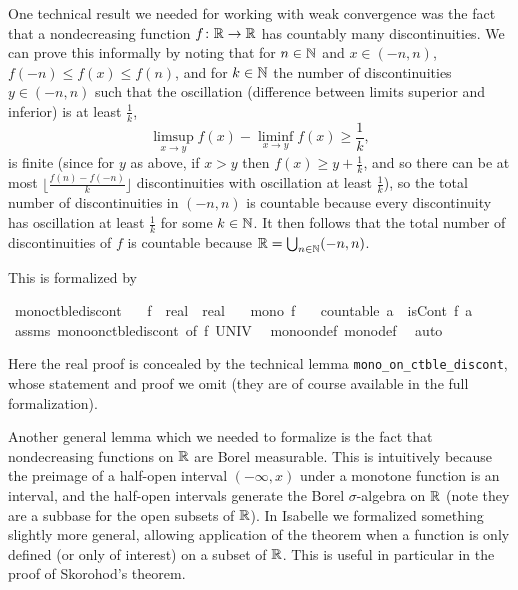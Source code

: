 \documentclass[leqno]{article}
\theoremstyle{definition}
\begin{document}
One technical result we needed for working with weak convergence was the fact that a nondecreasing function $f\colon \mathbb{R} \rightarrow \mathbb{R}$ has countably many discontinuities. We can prove this informally by noting that for $n \in \mathbb{N}$ and $x \in (-n,n)$, $f(-n) \le f(x) \le f(n)$, and for $k \in \mathbb{N}$ the number of discontinuities $y \in (-n,n)$ such that the oscillation (difference between limits superior and inferior) is at least $\frac{1}{k}$, 
\[ \limsup_{x \rightarrow y} f(x) - \liminf_{x \rightarrow y} f(x) \ge \frac{1}{k}, \]
is finite (since for $y$ as above, if $x > y$ then $f(x) \ge y + \frac{1}{k}$, and so there can be at most $\lfloor \frac{f(n) - f(-n)}{k} \rfloor$ discontinuities with oscillation at least $\frac{1}{k}$), so the total number of discontinuities in $(-n,n)$ is countable because every discontinuity has oscillation at least $\frac{1}{k}$ for some $k \in \mathbb{N}$. It then follows that the total number of discontinuities of $f$ is countable because $\mathbb{R} = \bigcup_{n \in \mathbb{N}} (-n,n)$.

This is formalized by

\medskip

\begin{isabellebody}
\isamarkupfalse%
\ mono{\isacharunderscore}ctble{\isacharunderscore}discont{\isacharcolon}\isanewline
\ \ \ f\ {\isacharcolon}{\isacharcolon}\ {\isachardoublequoteopen}real\ {\isasymRightarrow}\ real{\isachardoublequoteclose}\isanewline
\ \ \ {\isachardoublequoteopen}mono\ f{\isachardoublequoteclose}\isanewline
\ \ \ {\isachardoublequoteopen}countable\ {\isacharbraceleft}a{\isachardot}\ {\isasymnot}\ isCont\ f\ a{\isacharbraceright}{\isachardoublequoteclose}\isanewline
{}\isamarkupfalse%
\ assms\ mono{\isacharunderscore}on{\isacharunderscore}ctble{\isacharunderscore}discont\ {\isacharbrackleft}of\ f\ UNIV{\isacharbrackright}\ \isamarkupfalse%
\ mono{\isacharunderscore}on{\isacharunderscore}def\ mono{\isacharunderscore}def\ \isamarkupfalse%
\ auto%
\end{isabellebody}

\medskip

Here the real proof is concealed by the technical lemma \texttt{mono\_on\_ctble\_discont}, whose statement and proof we omit (they are of course available in the full formalization).

Another general lemma which we needed to formalize is the fact that nondecreasing functions on $\mathbb{R}$ are Borel measurable. This is intuitively because the preimage of a half-open interval $(-\infty,x)$ under a monotone function is an interval, and the half-open intervals generate the Borel $\sigma$-algebra on $\mathbb{R}$ (note they are a subbase for the open subsets of $\mathbb{R}$). In Isabelle we formalized something slightly more general, allowing application of the theorem when a function is only defined (or only of interest) on a subset of $\mathbb{R}$. This is useful in particular in the proof of Skorohod's theorem.
\end{document}
